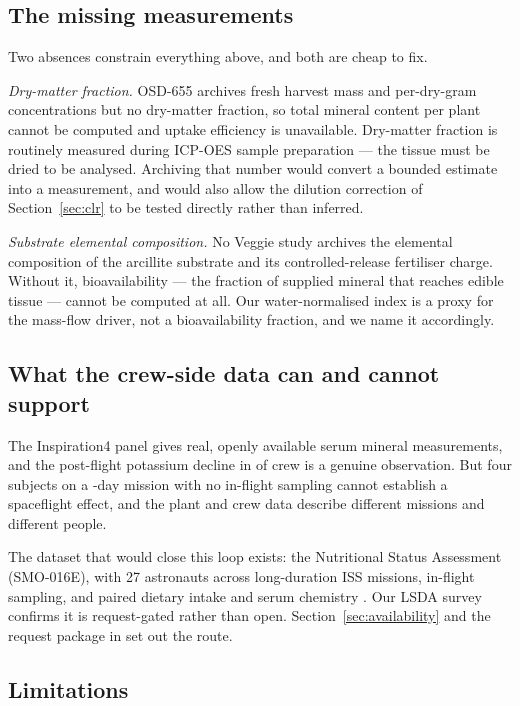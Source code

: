 \subsection{The missing measurements}

Two absences constrain everything above, and both are cheap to fix.

\emph{Dry-matter fraction.} OSD-655 archives fresh harvest mass and per-dry-gram
concentrations but no dry-matter fraction, so total mineral content per plant
cannot be computed and uptake efficiency is unavailable. Dry-matter fraction is
routinely measured during ICP-OES sample preparation --- the tissue must be
dried to be analysed. Archiving that number would convert a bounded estimate
into a measurement, and would also allow the dilution correction of
Section~\ref{sec:clr} to be tested directly rather than inferred.

\emph{Substrate elemental composition.} No Veggie study archives the elemental
composition of the arcillite substrate and its controlled-release fertiliser
charge. Without it, bioavailability --- the fraction of supplied mineral that
reaches edible tissue --- cannot be computed at all. Our water-normalised index
is a proxy for the mass-flow driver, not a bioavailability fraction, and we
name it accordingly.

\subsection{What the crew-side data can and cannot support}

The Inspiration4 panel gives real, openly available serum mineral measurements,
and the post-flight potassium decline in \AstrodownK{} of \AstroN{} crew is a
genuine observation. But four subjects on a \AstroDuration-day mission with no
in-flight sampling cannot establish a spaceflight effect, and the plant and crew
data describe different missions and different people.

The dataset that would close this loop exists: the Nutritional Status
Assessment (SMO-016E), with 27 astronauts across long-duration ISS missions,
in-flight sampling, and paired dietary intake and serum chemistry
\citep{zheng2023}. Our LSDA survey confirms it is request-gated rather than
open. Section~\ref{sec:availability} and the request package in
 set out the route.

\subsection{Limitations}


